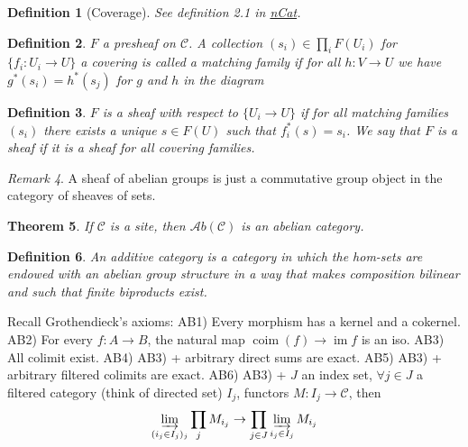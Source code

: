 \documentclass[12pt]{article}
\theoremstyle{darkgreentheorem}
\newtheorem{thm}{Theorem}[section]
\theoremstyle{darkbluedefinition}
\newtheorem{defn}[thm]{Definition}
\theoremstyle{darkredexample}
\theoremstyle{remark}
\newtheorem{rem}[thm]{Remark}
\newcommand{\1}{\mathbbm{1}}
\newcommand{\scrC}{\mathscr{C}}
\newcommand{\Ab}{\mathscr{A}b}
\DeclareMathOperator{\im}{im}
\begin{document}
\begin{defn}[Coverage]
    See definition 2.1 in \href{https://ncatlab.org/nlab/show/coverage}{nCat}.
\end{defn}

\begin{defn}
    $F$ a presheaf on $\scrC$.
    A collection $(s_{i})\in \prod_{i}F(U_{i})$ for $\{f_{i}\colon U_{i}\to U\}$ a covering is called a \textit{matching family} if for all $h\colon V\to U$ we have $g^{*}(s_{i})=h^{*}(s_{j})$ for $g$ and $h$ in the diagram
    \begin{center}
    \end{center}
\end{defn}

\begin{defn}
    $F$ is a sheaf with respect to $\{U_{i}\to U\}$ if for all matching families $(s_{i})$ there exists a unique $s\in F(U)$ such that $f_{i}^{*}(s)=s_{i}$.
    We say that $F$ is a \textit{sheaf} if it is a sheaf for all covering families.
\end{defn}

\begin{rem}
    A sheaf of abelian groups is just a commutative group object in the category of sheaves of sets.
\end{rem}

\begin{thm}
    If $\scrC$ is a site, then $\Ab(\scrC)$ is an abelian category.
\end{thm}

\begin{defn}
    An additive category is a category in which the hom-sets are endowed with an abelian group structure in a way that makes composition bilinear and such that finite biproducts exist.
\end{defn}

Recall Grothendieck's axioms:
AB1) Every morphism has a kernel and a cokernel.
AB2) For every $f\colon A\to B$, the natural map $\operatorname{coim}(f)\to \im{f}$ is an iso.
AB3) All colimit exist.
AB4) AB3) + arbitrary direct sums are exact.
AB5) AB3) + arbitrary filtered colimits are exact.
AB6) AB3) + $J$ an index set, $\forall j\in J$ a filtered category (think of directed set) $I_{j}$, functors $M\colon I_{j}\to \scrC$, then
\[\varinjlim_{(i_{j}\in I_{j})_{j}}\prod_{j} M_{i_{j}}\to \prod_{j\in J}\varinjlim_{i_{j}\in I_{j}} M_{i_{j}} \]
\end{document}
